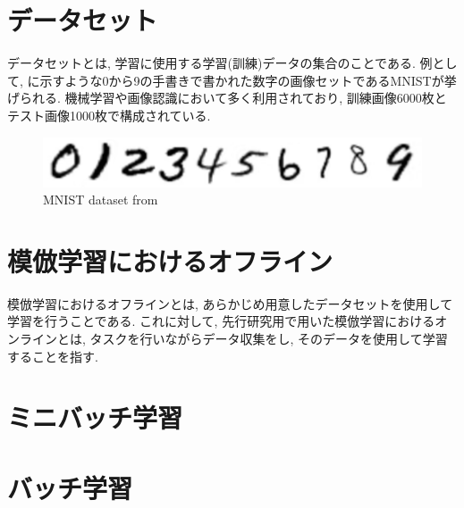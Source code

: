 \newpage
\section{データセット}
データセットとは, 学習に使用する学習(訓練)データの集合のことである. 例として, に示すような0から9の手書きで書かれた数字の画像セットであるMNISTが挙げられる. 機械学習や画像認識において多く利用されており, 訓練画像6000枚とテスト画像1000枚で構成されている. 

\vspace{10mm}

\begin{figure}[h]
     \centering
     \includegraphics[keepaspectratio, scale=0.5]
     {images/mnist.png}
     \caption{MNIST dataset from \cite{mnist}}
     \label{Fig:mnist}
     \end{figure}

\vspace{10mm}

\section{模倣学習におけるオフライン}
模倣学習におけるオフラインとは, あらかじめ用意したデータセットを使用して学習を行うことである. これに対して, 先行研究用で用いた模倣学習におけるオンラインとは, タスクを行いながらデータ収集をし, そのデータを使用して学習することを指す. 

\section{ミニバッチ学習}


\section{バッチ学習}